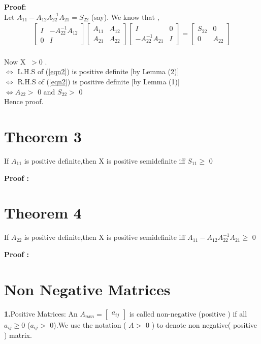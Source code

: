 {\bf Proof:} \\
Let $ A_{11}-A_{12}A_{22}^{-1}A_{21} = S_{22}$ (say).
We know that ,
\begin{eqnarray}\label{eqn2}
\begin{bmatrix}I & -A_{22}^{-1}A_{12} \\ 0 & I\end{bmatrix}
\begin{bmatrix}A_{11}&A_{12}\\ A_{21}&A_{22}\end{bmatrix}
\begin{bmatrix}I&0\\ -A_{22}^{-1}A_{21}&I\end{bmatrix}
=
\begin{bmatrix}S_{22}&0\\0&A_{22}\end{bmatrix} 
\end{eqnarray}                                                        
\\ Now  X $\ > $0 .
\\$\Longleftrightarrow $ L.H.S of (\ref{eqn2}) is positive definite [by Lemma (2)]
\\$\Longleftrightarrow $ R.H.S of (\ref{eqn2}) is positive definite [by Lemma (1)]
\\$\Longleftrightarrow A_{22} > $ 0  and  $ S_{22} > $ 0
\\Hence proof.


\section*{Theorem 3}
If $A_{11}$ is positive definite,then X is positive semidefinite iff  $S_{11}\geq$ 0

{\bf Proof :}
\section*{Theorem 4}


If $A_{22}$ is positive definite,then X is positive semidefinite iff $A_{11}-A_{12}A^{-1}_{22}A_{21}\geq$ 0

{\bf Proof :}


\section{Non Negative Matrices}

{\bf 1.}Positive Matrices: An $A_{nxn}=\begin{bmatrix}a_{ij}\end{bmatrix}$ is called non-negative (positive ) 
if all $a_{ij}\geq $0  ($a_{ij} > $  0).We use the notation ( $A > $ 0 ) to denote non negative( positive ) matrix.

